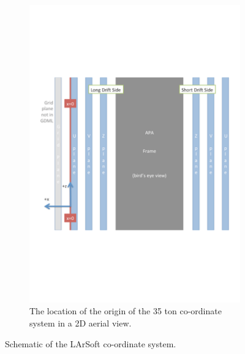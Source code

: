 \begin{figure}[h]
\begin{subfigure}{0.45\textwidth}
    \includegraphics[width=\textwidth]{35ton_xCenter}
    \caption{The location of the origin of the 35 ton co-ordinate system in a 2D aerial view.}
  \end{subfigure}
  \caption[The co-ordinate system in LArSoft]{Schematic of the LArSoft co-ordinate system.}
  \label{fig:LArSoft_coords}
\end{figure}

